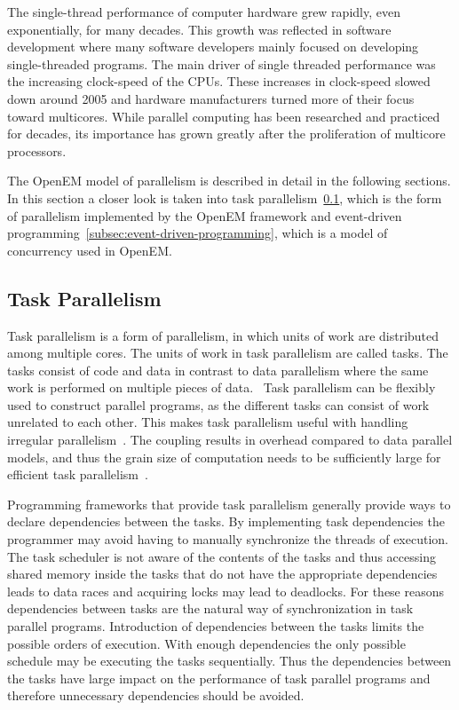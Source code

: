 The single-thread performance of computer hardware grew rapidly, even exponentially, for many decades. This growth was reflected in software development where many software developers mainly focused on developing single-threaded programs. The main driver of single threaded performance was the increasing clock-speed of the CPUs. These increases in clock-speed slowed down around 2005 and hardware manufacturers turned more of their focus toward multicores. While parallel computing has been researched and practiced for decades, its importance has grown greatly after the proliferation of multicore processors.~\cite{sutter2005free}

The OpenEM model of parallelism is described in detail in the following sections. In this section a closer look is taken into task parallelism~\ref{subsec:task-parallelism}, which is the form of parallelism implemented by the OpenEM framework and event-driven programming~\ref{subsec:event-driven-programming}, which is a model of concurrency used in OpenEM.

\subsection{Task Parallelism}
\label{subsec:task-parallelism}
Task parallelism is a form of parallelism, in which units of work are distributed among multiple cores. The units of work in task parallelism are called tasks. The tasks consist of code and data in contrast to data parallelism where the same work is performed on multiple pieces of data.~\cite{hennessy2011computer} Task parallelism can be flexibly used to construct parallel programs, as the different tasks can consist of work unrelated to each other. This makes task parallelism useful with handling irregular parallelism~\cite{ayguade2009design}. The coupling results in overhead compared to data parallel models, and thus the grain size of computation needs to be sufficiently large for efficient task parallelism~\cite{subhlok1993exploiting}.

Programming frameworks that provide task parallelism generally provide ways to declare dependencies between the tasks. By implementing task dependencies the programmer may avoid having to manually synchronize the threads of execution. The task scheduler is not aware of the contents of the tasks and thus accessing shared memory inside the tasks that do not have the appropriate dependencies leads to data races and acquiring locks may lead to deadlocks. For these reasons dependencies between tasks are the natural way of synchronization in task parallel programs. Introduction of dependencies between the tasks limits the possible orders of execution. With enough dependencies the only possible schedule may be executing the tasks sequentially. Thus the dependencies between the tasks have large impact on the performance of task parallel programs and therefore unnecessary dependencies should be avoided.~\cite{hennessy2011computer}

